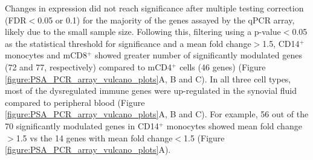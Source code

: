 Changes in expression did not reach significance after multiple testing correction (FDR$<$0.05 or 0.1) for the majority of the genes assayed by the qPCR array, likely due to the small sample size. Following this, filtering using a p-value$<$0.05 as the statistical threshold for significance and a mean fold change$>$1.5, CD14$^+$ monocytes and mCD8$^+$ showed greater number of significantly modulated genes (72 and 77, respectively) compared to mCD4$^+$ cells (46 genes) (Figure \ref{figure:PSA_PCR_array_vulcano_plots}A, B and C). In all three cell types, most of the dysregulated immune genes were up-regulated in the synovial fluid compared to peripheral blood (Figure \ref{figure:PSA_PCR_array_vulcano_plots}A, B and C). For example, 56 out of the 70 significantly modulated genes in CD14$^+$ monocytes showed mean fold change$>$1.5 vs the 14 genes with mean fold change$<$1.5 (Figure \ref{figure:PSA_PCR_array_vulcano_plots}A).

